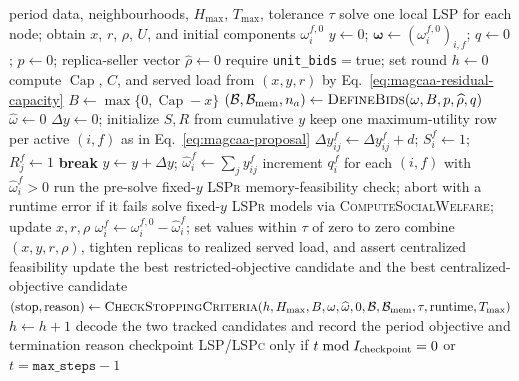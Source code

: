 \begin{algorithm}[H]
\caption{\textsc{FaaS-MAGCAA} at one control period}
\label{alg:magcaa}
\begin{algorithmic}[1]
\Require period data, neighbourhoods, $H_{\max}$, $T_{\max}$, tolerance $\tau$
\State solve one local \textsc{LSP} for each node; obtain $x$, $r$, $\rho$, $U$, and initial components $\omega_i^{f,0}$
\State $y\gets0$; $\boldsymbol\omega\gets(\omega_i^{f,0})_{i,f}$; $q\gets0$; $p\gets0$; replica-seller vector $\widehat\rho\gets0$
\State require \texttt{unit\_bids}${}={}$true; set round $h\gets0$
\Repeat
  \State compute $\operatorname{Cap}$, $C$, and served load from $(x,y,r)$ by Eq.~\eqref{eq:magcaa-residual-capacity}
  \State $B\gets\max\{0,\operatorname{Cap}-x\}$
  \State $(\mathcal B,\mathcal B_{\rm mem},n_a)\gets\textsc{DefineBids}(\omega,B,p,\widehat\rho,q)$
  \State $\widehat\omega\gets0$
    \State $\Delta y\gets0$; initialize $S,R$ from cumulative $y$
    \State keep one maximum-utility row per active $(i,f)$ as in Eq.~\eqref{eq:magcaa-proposal}
            \State $\Delta y_{ij}^f\gets\Delta y_{ij}^f+d$; $S_i^f\gets1$; $R_j^f\gets1$
            \State \textbf{break}
          \EndIf
        \EndFor
      \EndIf
    \EndFor
    \State $y\gets y+\Delta y$; $\widehat\omega_i^f\gets\sum_j y_{ij}^f$
    \State increment $q_i^f$ for each $(i,f)$ with $\widehat\omega_i^f>0$
    \State run the pre-solve fixed-$y$ \textsc{LSPr} memory-feasibility check; abort with a runtime error if it fails
    \State solve fixed-$y$ \textsc{LSPr} models via \textsc{ComputeSocialWelfare}; update $x,r,\rho$
    \State $\omega_i^f\gets\omega_i^{f,0}-\widehat\omega_i^f$; set values within $\tau$ of zero to zero
  \EndIf
  \State combine $(x,y,r,\rho)$, tighten replicas to realized served load, and assert centralized feasibility
  \State update the best restricted-objective candidate and the best centralized-objective candidate
  \State $(\mathrm{stop},\mathrm{reason})\gets\textsc{CheckStoppingCriteria}(h,H_{\max},B,\omega,\widehat\omega,0,\mathcal B,\mathcal B_{\rm mem},\tau,\mathrm{runtime},T_{\max})$
   \State $h\gets h+1$ \EndIf
{}
\State decode the two tracked candidates and record the period objective and termination reason
\State checkpoint \textsc{LSP}/\textsc{LSPc} only if $t\bmod I_{\rm checkpoint}=0$ or $t=\texttt{max\_steps}-1$
\end{algorithmic}
\end{algorithm}

